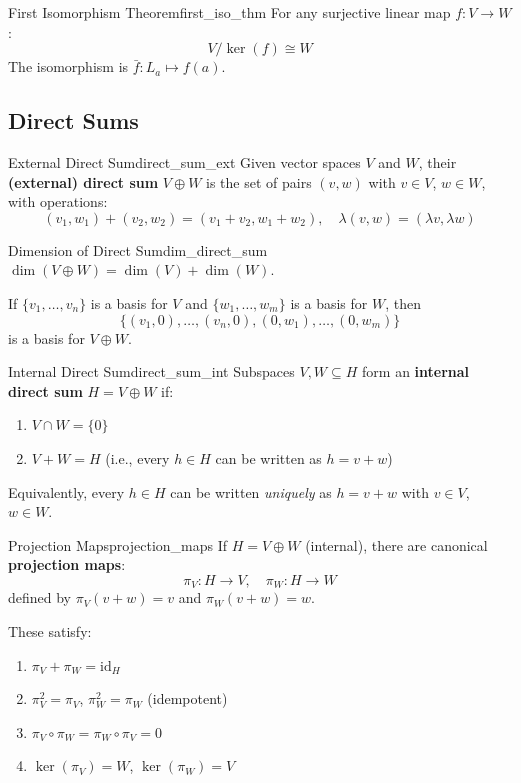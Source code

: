 \documentclass[11pt, letterpaper, openany]{book}
\begin{document}
\begin{cor}{First Isomorphism Theorem}{first_iso_thm}
For any surjective linear map $f: V \to W$:
\[V/\ker(f) \cong W\]
The isomorphism is $\bar{f}: L_a \mapsto f(a)$.
\end{cor}

\subsection{Direct Sums}

\begin{defn}{External Direct Sum}{direct_sum_ext}
Given vector spaces $V$ and $W$, their \textbf{(external) direct sum} $V \oplus W$ is the set of pairs $(v, w)$ with $v \in V$, $w \in W$, with operations:
\[(v_1, w_1) + (v_2, w_2) = (v_1 + v_2, w_1 + w_2), \quad \lambda(v, w) = (\lambda v, \lambda w)\]
\end{defn}

\begin{thm}{Dimension of Direct Sum}{dim_direct_sum}
$\dim(V \oplus W) = \dim(V) + \dim(W)$.

If $\{v_1, \ldots, v_n\}$ is a basis for $V$ and $\{w_1, \ldots, w_m\}$ is a basis for $W$, then
\[\{(v_1, 0), \ldots, (v_n, 0), (0, w_1), \ldots, (0, w_m)\}\]
is a basis for $V \oplus W$.
\end{thm}

\begin{defn}{Internal Direct Sum}{direct_sum_int}
Subspaces $V, W \subseteq H$ form an \textbf{internal direct sum} $H = V \oplus W$ if:
\begin{enumerate}
    \item $V \cap W = \{0\}$
    \item $V + W = H$ (i.e., every $h \in H$ can be written as $h = v + w$)
\end{enumerate}
Equivalently, every $h \in H$ can be written \emph{uniquely} as $h = v + w$ with $v \in V$, $w \in W$.
\end{defn}

\begin{thm}{Projection Maps}{projection_maps}
If $H = V \oplus W$ (internal), there are canonical \textbf{projection maps}:
\[\pi_V: H \to V, \quad \pi_W: H \to W\]
defined by $\pi_V(v + w) = v$ and $\pi_W(v + w) = w$.

These satisfy:
\begin{enumerate}
    \item $\pi_V + \pi_W = \text{id}_H$
    \item $\pi_V^2 = \pi_V$, $\pi_W^2 = \pi_W$ (idempotent)
    \item $\pi_V \circ \pi_W = \pi_W \circ \pi_V = 0$
    \item $\ker(\pi_V) = W$, $\ker(\pi_W) = V$
\end{enumerate}
\end{thm}
\end{document}

